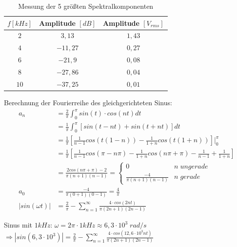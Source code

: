 \documentclass[12pt,a4paper,titlepage]{article}
\begin{document}
\begin{table}[H]
  \centering
  \begin{tabular}{c|c|c}
    $f [kHz]$ & Amplitude $[dB]$ & Amplitude $[V_{rms}]$ \\
    \hline
    $2$ & $3,13$ & $1,43$ \\
    \hline
    $4$ & $-11,27$ & $0,27$ \\
    \hline
    $6$ & $-21,9$ & $0,08$ \\
    \hline
    $8$ & $-27,86$ & $0,04$ \\
    \hline
    $10$ & $-37,25$ & $0,01$ \\
  \end{tabular}
  \caption{Messung der 5 größten Spektralkomponenten}
\end{table}

\noindent Berechnung der Fourierreihe des gleichgerichteten Sinus:\\
\begin{align*}
    a_n &= \frac{2}{\pi}\int_{0}^{\pi}sin(t)\cdot cos(nt) dt\\
    &= \frac{1}{\pi}\int_{0}^{\pi}\left[sin(t - nt) + sin(t + nt)\right] dt\\
    &= \frac{1}{\pi}\left[\frac{1}{n-1}cos(t(1-n)) - \frac{1}{1+n}cos(t(1+n))\right]\biggr\rvert_{0}^{\pi}\\
    &= \frac{1}{\pi}\left[\frac{1}{n-1}cos(\pi-n\pi) - \frac{1}{1+n}cos(n\pi + \pi) - \frac{1}{n-1} + \frac{1}{1+n}\right]\\
    &= \frac{2cos(n\pi + \pi) - 2}{\pi(n+1)(n-1)} = \left\{
	    \begin{array}{ll}
		     0  & n \; ungerade \\
		     \frac{-4}{\pi(n+1)(n-1)} & n \; gerade
	    \end{array}
    \right.\\
    a_0 &= \frac{-4}{\pi(0+1)(0-1)} = \frac{4}{\pi}\\
    |sin(\omega t)| &= \frac{2}{\pi} - \sum_{n=1}^{\infty} \frac{4 \cdot cos(2n t)}{\pi(2n+1)(2n-1)}
\end{align*}

\noindent Sinus mit $1kHz$: $\omega = 2\pi\cdot1kHz \approx 6,3\cdot 10^3 \; rad/s  $\\
$\Rightarrow |sin(6,3\cdot 10^3)| = \frac{2}{\pi} - \sum_{n=1}^{\infty} \frac{4 \cdot cos(12,6\cdot 10^3 n t)}{\pi(2n+1)(2n-1)}$
\end{document}
